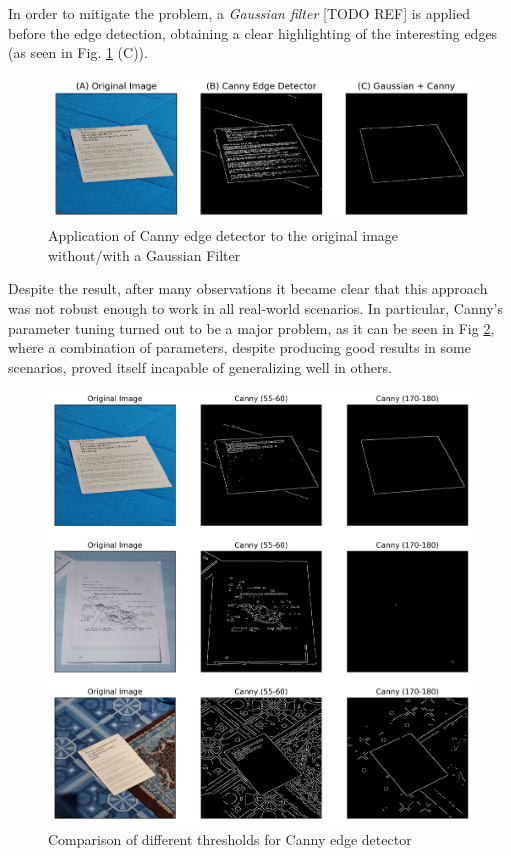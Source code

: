 \documentclass[a4paper]{article}
\begin{document}
In order to mitigate the problem, a \textit{Gaussian filter} [TODO REF] is applied before the edge detection, obtaining a clear highlighting of the interesting edges (as seen in Fig.  \ref{fig:canny_gaussian} (C)).

\begin{figure}[!htb]
	\includegraphics[width=\linewidth]{canny_gaussian.png}
	\caption{Application of Canny edge detector to the original image without/with a Gaussian Filter}
	\label{fig:canny_gaussian}
\end{figure}

Despite the result, after many observations it became clear that this approach was not robust enough to
work in all real-world scenarios. In particular, Canny's parameter tuning turned out to be a major
problem, as it can be seen in Fig \ref{fig:canny_comparison}, where a combination of parameters,
despite producing good results in some scenarios, proved itself incapable of generalizing well in others.

\begin{figure}[htb!]
	\includegraphics[width=\linewidth]{canny_comparison.png}
	\caption{Comparison of different thresholds for Canny edge detector}
	\label{fig:canny_comparison}
\end{figure}
\end{document}
